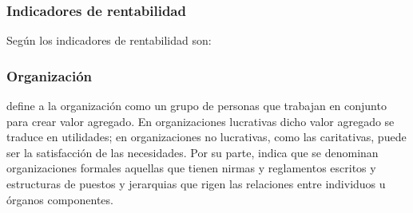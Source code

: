 

\subsubsection{Indicadores de rentabilidad}
Seg\'un \cite{cruz} los indicadores de rentabilidad son:




\subsubsection{Organizaci\'on}
\cite{koontz} define a la organizaci\'on como un grupo de personas que trabajan en
conjunto para crear valor agregado. En organizaciones lucrativas dicho valor agregado
se traduce en utilidades; en organizaciones no lucrativas, como las caritativas,
puede ser la satisfacci\'on de las necesidades. Por su parte, \citep{chiavenato}
indica que se denominan organizaciones formales aquellas que tienen nirmas y reglamentos
escritos y estructuras de puestos y jerarquias que rigen las relaciones entre
individuos u \'organos componentes.

